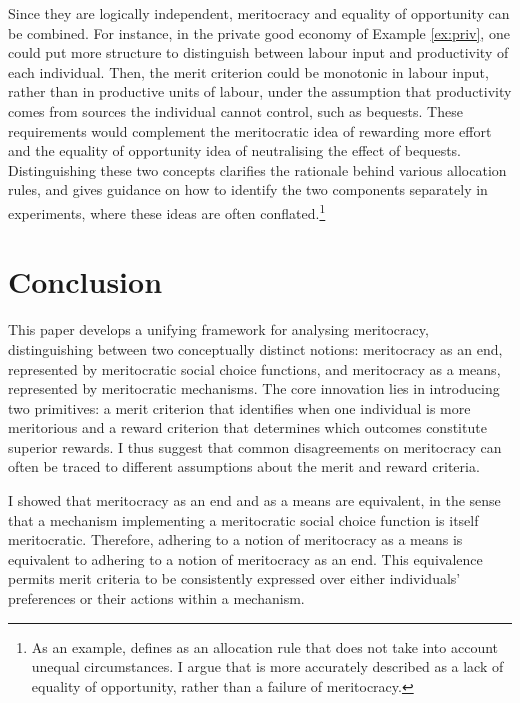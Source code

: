 Since they are logically independent, meritocracy and equality of opportunity can be combined. For instance, in the private good economy of Example \ref{ex:priv}, one could put more structure to distinguish between labour input and productivity of each individual. Then, the merit criterion could be monotonic in labour input, rather than in productive units of labour, under the assumption that productivity comes from sources the individual cannot control, such as bequests. These requirements would complement the meritocratic idea of rewarding more effort and the equality of opportunity idea of neutralising the effect of bequests. Distinguishing these two concepts clarifies the rationale behind various allocation rules, and gives guidance on how to identify the two components separately in experiments, where these ideas are often conflated.\footnote{As an example, \cite{andreShallowMeritocracy2025} defines  as an allocation rule that does not take into account unequal circumstances. I argue that  is more accurately described as a lack of equality of opportunity, rather than a failure of meritocracy.}

\section{Conclusion}\label{sec:conclusionmerit}

This paper develops a unifying framework for analysing meritocracy, distinguishing between two conceptually distinct notions: meritocracy as an end, represented by meritocratic social choice functions, and meritocracy as a means, represented by meritocratic mechanisms. The core innovation lies in introducing two primitives: a merit criterion that identifies when one individual is more meritorious and a reward criterion that determines which outcomes constitute superior rewards. I thus suggest that common disagreements on meritocracy can often be traced to different assumptions about the merit and reward criteria.

I showed that meritocracy as an end and as a means are equivalent, in the sense that a mechanism implementing a meritocratic social choice function is itself meritocratic. Therefore, adhering to a notion of meritocracy as a means is equivalent to adhering to a notion of meritocracy as an end. This equivalence permits merit criteria to be consistently expressed over either individuals’ preferences or their actions within a mechanism.

